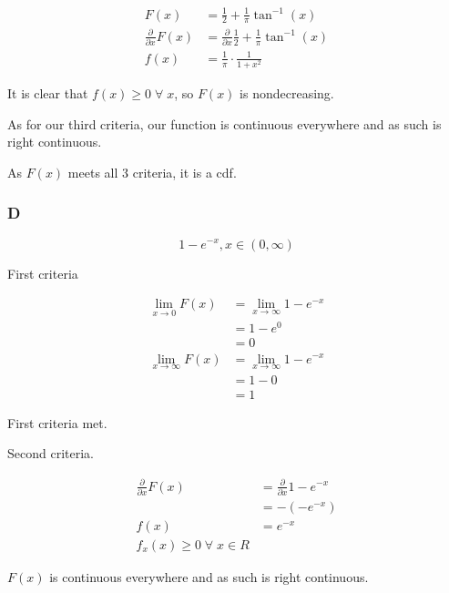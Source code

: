 \begin{align*}
	F(x) &= \frac{1}{2} + \frac{1}{\pi} \tan^{-1}(x) \\
	\frac{\partial}{\partial x} F(x) &= \frac{\partial}{\partial x} \frac{1}{2} + \frac{1}{\pi} \tan^{-1}(x) \\
	f(x) &= \frac{1}{\pi} \cdot \frac{1}{1 + x^2}
\end{align*}

It is clear that $f(x) \geq 0 \;\forall\; x$, so $F(x)$ is nondecreasing.

As for our third criteria, our function is continuous everywhere and as such is right continuous.

As $F(x)$ meets all 3 criteria, it is a cdf.

\subsubsection*{D}

\[
	1 - e^{-x}, x \in (0, \infty)
\]

First criteria

\begin{align*}
	\lim_{x \to 0} F(x) &= \lim_{x \to \infty} 1 - e^{-x} \\
	&= 1 - e^0 \\
	&= 0 \\
	\lim_{x \to \infty} F(x) &= \lim_{x \to \infty} 1 - e^{-x} \\
	&= 1 - 0 \\
	&= 1
\end{align*}

First criteria met.

Second criteria.

\begin{align*}
	\frac{\partial}{\partial x} F(x) &= \frac{\partial}{\partial x} 1 - e^{-x} \\
	&= -(-e^{-x}) \\
	f(x) &= e^{-x} \\
	f_x(x) \geq 0 \; \forall \; x \in R
\end{align*}

$F(x)$ is continuous everywhere and as such is right continuous.
